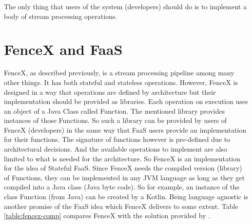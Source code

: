 \documentclass[a4]{report}
\begin{document}
    The only thing that users of the system (developers) should do is to implement a body of stream processing operations.


    \section{FenceX and FaaS}
    FenceX, as described previously, is a stream processing pipeline among many other things.
    It has both stateful and stateless operations.
    However, FenceX is designed in a way that operations are defined by architecture but their implementation should be provided as libraries.
    Each operation on execution uses an object of a Java Class called Function.
    The mentioned library provides instances of those Functions.
    So such a library can be provided by users of FenceX (developers) in the same way that FaaS users provide an implementation for their functions.
    The signature of functions however is pre-defined due to architectural decisions.
    And the available operations to implement are also limited to what is needed for the architecture.
    So FenceX is an implementation for the idea of Stateful FaaS.
    Since FenceX needs the compiled version (library) of Functions, they can be implemented in any JVM language as long as they get compiled into a Java class (Java byte code).
    So for example, an instance of the class Function (from Java) can be created by a Kotlin\cite{kotlin}.
    Being language agnostic is another promise of the FaaS idea which FenceX delivers to some extent.
    Table \ref{table:fencex-comp} compares FenceX with the solution provided by \cite{Functions-as-a-Service-2020}.
\end{document}
